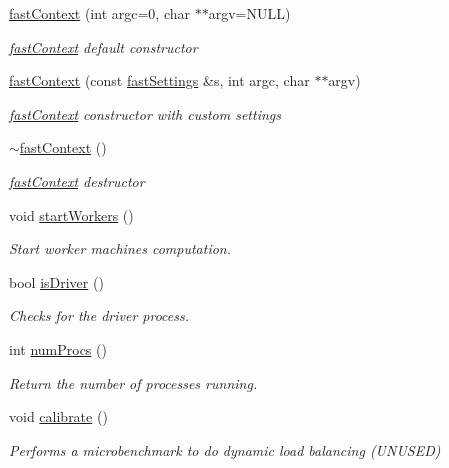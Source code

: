 \begin{DoxyCompactItemize}
\item 
\hyperlink{classfaster_1_1fastContext_adf84c9fd9f1d768f1fb8ba8bdd13bb47}{fast\+Context} (int argc=0, char $\ast$$\ast$argv=N\+U\+LL)
\begin{DoxyCompactList}\small\item\em \hyperlink{classfaster_1_1fastContext}{fast\+Context} default constructor \end{DoxyCompactList}\item 
\hypertarget{classfaster_1_1fastContext_a6836e1da0e0400ee290376d7cdec4fae}{}\label{classfaster_1_1fastContext_a6836e1da0e0400ee290376d7cdec4fae} 
\hyperlink{classfaster_1_1fastContext_a6836e1da0e0400ee290376d7cdec4fae}{fast\+Context} (const \hyperlink{classfaster_1_1fastSettings}{fast\+Settings} \&s, int argc, char $\ast$$\ast$argv)
\begin{DoxyCompactList}\small\item\em \hyperlink{classfaster_1_1fastContext}{fast\+Context} constructor with custom settings \end{DoxyCompactList}\item 
\hypertarget{classfaster_1_1fastContext_a055ea19ba9b7597ebd8b2d950a2d7e06}{}\label{classfaster_1_1fastContext_a055ea19ba9b7597ebd8b2d950a2d7e06} 
\hyperlink{classfaster_1_1fastContext_a055ea19ba9b7597ebd8b2d950a2d7e06}{$\sim$fast\+Context} ()
\begin{DoxyCompactList}\small\item\em \hyperlink{classfaster_1_1fastContext}{fast\+Context} destructor \end{DoxyCompactList}\item 
void \hyperlink{classfaster_1_1fastContext_a1f6b1c1a940d67b434ac95bad4770508}{start\+Workers} ()
\begin{DoxyCompactList}\small\item\em Start worker machines computation. \end{DoxyCompactList}\item 
bool \hyperlink{classfaster_1_1fastContext_a4c4b1bc0cfe9f4e4a7959cc176d2ec24}{is\+Driver} ()
\begin{DoxyCompactList}\small\item\em Checks for the driver process. \end{DoxyCompactList}\item 
int \hyperlink{classfaster_1_1fastContext_a287bc160898c677df176de122d9dfad9}{num\+Procs} ()
\begin{DoxyCompactList}\small\item\em Return the number of processes running. \end{DoxyCompactList}\item 
\hypertarget{classfaster_1_1fastContext_a3dd0172c18a37d863adf28b794020e5c}{}\label{classfaster_1_1fastContext_a3dd0172c18a37d863adf28b794020e5c} 
void \hyperlink{classfaster_1_1fastContext_a3dd0172c18a37d863adf28b794020e5c}{calibrate} ()
\begin{DoxyCompactList}\small\item\em Performs a microbenchmark to do dynamic load balancing (U\+N\+U\+S\+ED) \end{DoxyCompactList}\end{DoxyCompactItemize}
